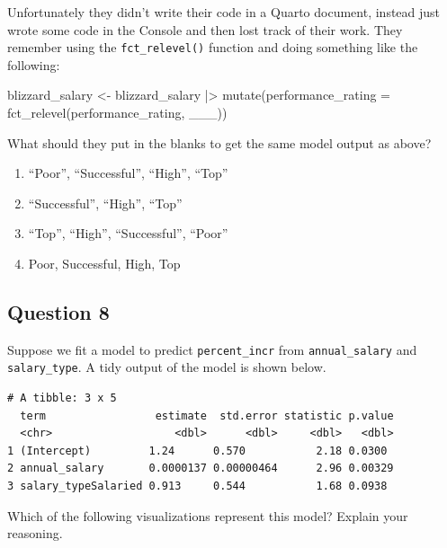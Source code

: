 \documentclass[
  letterpaper,
  DIV=11,
  numbers=noendperiod]{scrartcl}
\newenvironment{Shaded}{\begin{snugshade}}{\end{snugshade}}
\newcommand{\AttributeTok}[1]{\textcolor[rgb]{0.40,0.45,0.13}{#1}}
\newcommand{\FunctionTok}[1]{\textcolor[rgb]{0.28,0.35,0.67}{#1}}
\newcommand{\NormalTok}[1]{\textcolor[rgb]{0.00,0.23,0.31}{#1}}
\newcommand{\OtherTok}[1]{\textcolor[rgb]{0.00,0.23,0.31}{#1}}
\newcommand{\SpecialCharTok}[1]{\textcolor[rgb]{0.37,0.37,0.37}{#1}}
\providecommand{\tightlist}{%
  \setlength{\itemsep}{0pt}\setlength{\parskip}{0pt}}\usepackage{longtable,booktabs,array}
\begin{document}
Unfortunately they didn't write their code in a Quarto document, instead
just wrote some code in the Console and then lost track of their work.
They remember using the \texttt{fct\_relevel()} function and doing
something like the following:

\begin{Shaded}
\begin{Highlighting}[]
\NormalTok{blizzard\_salary }\OtherTok{\textless{}{-}}\NormalTok{ blizzard\_salary }\SpecialCharTok{|\textgreater{}}
  \FunctionTok{mutate}\NormalTok{(}\AttributeTok{performance\_rating =} \FunctionTok{fct\_relevel}\NormalTok{(performance\_rating, \_\_\_))}
\end{Highlighting}
\end{Shaded}

What should they put in the blanks to get the same model output as
above?

\begin{enumerate}
\def\labelenumi{\alph{enumi}.}
\tightlist
\item
  ``Poor'', ``Successful'', ``High'', ``Top''
\item
  ``Successful'', ``High'', ``Top''
\item
  ``Top'', ``High'', ``Successful'', ``Poor''
\item
  Poor, Successful, High, Top
\end{enumerate}

\hypertarget{question-8}{%
\subsection{Question 8}\label{question-8}}

Suppose we fit a model to predict \texttt{percent\_incr} from
\texttt{annual\_salary} and \texttt{salary\_type}. A tidy output of the
model is shown below.

\begin{verbatim}
# A tibble: 3 x 5
  term                 estimate  std.error statistic p.value
  <chr>                   <dbl>      <dbl>     <dbl>   <dbl>
1 (Intercept)         1.24      0.570           2.18 0.0300 
2 annual_salary       0.0000137 0.00000464      2.96 0.00329
3 salary_typeSalaried 0.913     0.544           1.68 0.0938 
\end{verbatim}

Which of the following visualizations represent this model? Explain your
reasoning.
\end{document}
